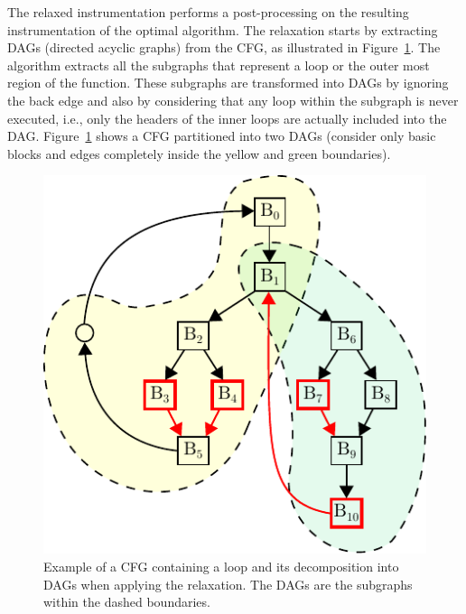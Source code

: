 The relaxed instrumentation performs a post-processing on the resulting instrumentation of the optimal algorithm.
The relaxation starts by extracting DAGs (directed acyclic graphs) from the CFG, as illustrated in Figure~\ref{fig:cfg-relax-example}.
The algorithm extracts all the subgraphs that represent a loop or the outer most region of the function.
These subgraphs are transformed into DAGs by ignoring the back edge and also by considering that any loop within the subgraph is never executed, i.e., only the headers of the inner loops are actually included into the DAG.
Figure~\ref{fig:cfg-relax-example} shows a CFG partitioned into two DAGs (consider only basic blocks and edges completely inside the yellow and green boundaries).
%
%

\begin{figure}[h]
  \centering
  \includegraphics[scale=1]{figs/cfg-relax-example.pdf}
  \caption{Example of a CFG containing a loop and its decomposition into DAGs when applying the relaxation.
           The DAGs are the subgraphs within the dashed boundaries.}
  \label{fig:cfg-relax-example}
\end{figure}

